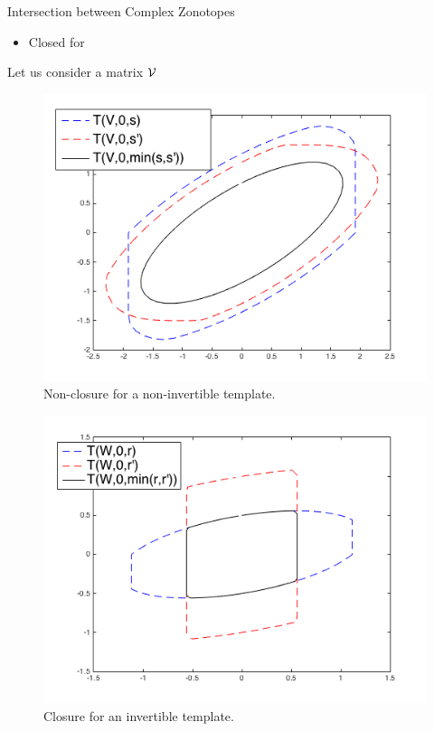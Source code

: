 \begin{frame}{Intersection between Complex Zonotopes}
%
\begin{itemize}
\item Closed for 
\end{itemize}
%
\begin{block}{}
Let us consider a  matrix $\mathcal{V}$
%

\begin{center}
\end{center}
%
\end{block}
%
\begin{minipage}{0.48\textwidth}
\begin{figure}
  \center
  \caption{Non-closure  for a non-invertible template.}
  \includegraphics[scale=0.3]{figures/CZtopes/nonclosure.png}
\end{figure}
\end{minipage}
%
\begin{minipage}{0.48\textwidth}
\begin{figure}
  \center
  \caption{Closure for an invertible template.}
  \includegraphics[scale=0.35]{figures/CZtopes/closure.png}

\end{figure}
\end{minipage}
\end{frame}
